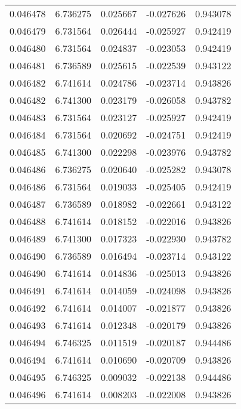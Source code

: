 \begin{tabular}{lrrrr}
0.046478    &  6.736275 &  0.025667 & -0.027626 &             0.943078 \\
0.046479    &  6.731564 &  0.026444 & -0.025927 &             0.942419 \\
0.046480    &  6.731564 &  0.024837 & -0.023053 &             0.942419 \\
0.046481    &  6.736589 &  0.025615 & -0.022539 &             0.943122 \\
0.046482    &  6.741614 &  0.024786 & -0.023714 &             0.943826 \\
0.046482    &  6.741300 &  0.023179 & -0.026058 &             0.943782 \\
0.046483    &  6.731564 &  0.023127 & -0.025927 &             0.942419 \\
0.046484    &  6.731564 &  0.020692 & -0.024751 &             0.942419 \\
0.046485    &  6.741300 &  0.022298 & -0.023976 &             0.943782 \\
0.046486    &  6.736275 &  0.020640 & -0.025282 &             0.943078 \\
0.046486    &  6.731564 &  0.019033 & -0.025405 &             0.942419 \\
0.046487    &  6.736589 &  0.018982 & -0.022661 &             0.943122 \\
0.046488    &  6.741614 &  0.018152 & -0.022016 &             0.943826 \\
0.046489    &  6.741300 &  0.017323 & -0.022930 &             0.943782 \\
0.046490    &  6.736589 &  0.016494 & -0.023714 &             0.943122 \\
0.046490    &  6.741614 &  0.014836 & -0.025013 &             0.943826 \\
0.046491    &  6.741614 &  0.014059 & -0.024098 &             0.943826 \\
0.046492    &  6.741614 &  0.014007 & -0.021877 &             0.943826 \\
0.046493    &  6.741614 &  0.012348 & -0.020179 &             0.943826 \\
0.046494    &  6.746325 &  0.011519 & -0.020187 &             0.944486 \\
0.046494    &  6.741614 &  0.010690 & -0.020709 &             0.943826 \\
0.046495    &  6.746325 &  0.009032 & -0.022138 &             0.944486 \\
0.046496    &  6.741614 &  0.008203 & -0.022008 &             0.943826 \\

\end{tabular}
